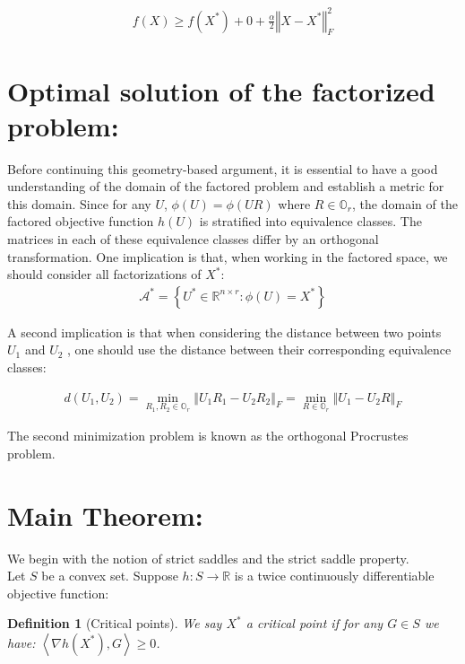 \documentclass{article}
\newtheorem{definition}{Definition}
\begin{document}
\begin{align*}
    f\left(X\right)\ge f\left(X^{*}\right)+0+\frac{\alpha}{2}\left\Vert X-X^{*}\right\Vert _{F}^{2}
\end{align*}


\section{Optimal solution of the factorized problem:}

Before continuing this geometry-based argument, it is essential to have a good understanding of the domain of the
factored problem and establish a metric for this domain. Since for any $U$, $\phi\left(U\right)=\phi\left(UR\right)$ where $R\in \mathbb{O}_r$, the domain of the factored objective function $h\left(U\right)$ is stratified into equivalence classes. The matrices in each of these equivalence classes differ by an orthogonal transformation. One implication is that, when working in the factored space, we should
consider all factorizations of $X^*$: 
\begin{align*}
    \mathcal{A}^*=\left\{ U^*\in \mathbb{R}^{n\times r}:\phi\left(U\right)=X^*\right\} 
\end{align*}

A second implication is that when considering the distance between two points $U_1$ and $U_2$ , one should use the distance between their corresponding equivalence classes:

\begin{align*}
    d\left(U_1,U_2\right)=\min_{R_1,R_2\in \mathbb{O}_r}\left\Vert U_1R_1 - U_2R_2\right\Vert_F = \min_{R\in \mathbb{O}_r}\left\Vert U_1 - U_2R\right\Vert _F
\end{align*}

The second minimization problem is known as the orthogonal Procrustes problem. 

\section{Main Theorem:}

We begin with the notion of strict saddles and the strict saddle property.\\
Let $S$ be a convex set. Suppose $h:S\rightarrow \mathbb{R}$ is a twice continuously differentiable objective function:

\begin{definition}[Critical points]
We say $X^*$ a critical point if for any $G\in S$ we have: $\left<\nabla h\left(X^{*}\right),G\right>\ge0$.
\end{definition}
\end{document}
